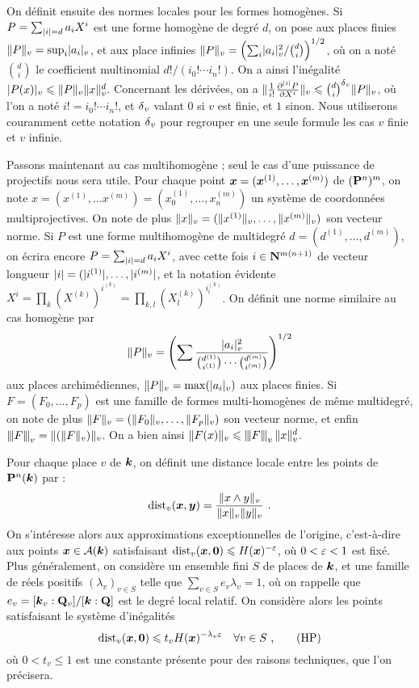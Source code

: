 \documentclass{mpg-preth}
\begin{document}
On définit ensuite des normes locales pour les formes homogènes. Si $P =
\sum_{\lvert i\rvert =d} a_i X^i$ est une forme homogène de degré $d$, on pose aux
places finies $\lVert P\rVert_{v} = \sup_i \lvert a_i\rvert_{v}$, et aux place infinies $\lVert P\rVert_{v} =
\left( \sum_i \lvert a_i\rvert_{v}^2/\binom{d}{i} \right)^{1/2}$, où on a noté
$\binom{d}{i}$ le coefficient multinomial $d!/(i_0!\cdots i_n!)$. On a ainsi
l'inégalité $\lvert P(x)\rvert_{v} \leqslant \lVert P\rVert_{v} \lVert x\rVert_{v}^d$. Concernant les dérivées, on a
$\lVert\frac{1}{i!}\frac{\partial^{\lvert i\rvert}P}{\partial X^i}\rVert_{v} \leqslant \binom{d}{i}^{\delta\smash{_v}}
\lVert P\rVert_{v}$, où l'on a noté $i! = i_0! \cdots i_n!$, et ${\delta\smash{_v}}$ valant $0$ si $v$
est finie, et $1$ sinon. Nous utiliserons couramment cette notation ${\delta\smash{_v}}$ pour
regrouper en une seule formule les cas $v$ finie et $v$ infinie.

Passons maintenant au cas multihomogène ; seul le cas d'une puissance de
projectifs nous sera utile. Pour chaque point ${\boldsymbol{x}} = ({\boldsymbol{x}}^{(1)}, \dots,
{\boldsymbol{x}}^{(m)})$ de $({\mathbf{P}}^n)^m$, on note $x = (x^{(1)}, \dots x^{(m)}) =
(x_0^{(1)}, \dots, x_n^{(m)})$ un système de coordonnées multiprojectives. On
note de plus $\lVert x\rVert_{v} = (\lVert x^{(1)}\rVert_{v},\dots, \lVert x^{(m)}\rVert_{v})$ son vecteur norme.
Si $P$ est une forme multihomogène de multidegré $d= (d^{(1)}, \dots,
d^{(m)})$, on écrira encore $P = \sum_{\lvert i\rvert=d} a_i X^i$, avec cette fois $i
\in {\mathbf{N}}^{m(n+1)}$ de vecteur longueur $\lvert i\rvert = (|i^{(1)}|, \dots, |i^{(m)}|$,
et la notation évidente $X^i = \prod_{k} (X^{(k)})^{i^{(k)}} = \prod_{k, l}
(X_l^{(k)})^{i_l^{(k)}}$. On définit une norme similaire au cas homogène par
\[
  \lVert P\rVert_{v} = \left( \sum \frac{ \lvert a_i\rvert_{v}^2}{\binom{d^{(1)}}{i^{(1)}} \cdots
  \binom{d^{(m)}}{i^{(m)}} } \right)^{1/2}
\]
aux places archimédiennes, $\lVert P\rVert_{v} = \max(\lvert a_i\rvert_{v})$ aux places finies. Si
$F = (F_0, \dots, F_p)$ est une famille de formes multi-homogènes de même
multidegré, on note de plus $\lVert F\rVert_{v} = (\lVert F_0\rVert_{v}, \dots, \lVert F_p\rVert_{v})$ son vecteur
norme, et enfin $\left\lvert\hspace{-1pt}\left\lvert\hspace{-1pt} \left\lvert F\right\rvert \hspace{-1pt}\right\rvert\hspace{-1pt}\right\rvert_{v} = \lVert(\lVert F\rVert_{v})\rVert_{v}$. On a bien ainsi $\lVert F(x)\rVert_{v} \leqslant
\left\lvert\hspace{-1pt}\left\lvert\hspace{-1pt} \left\lvert F\right\rvert \hspace{-1pt}\right\rvert\hspace{-1pt}\right\rvert_{v}\lVert x\rVert_{v}^d$.

Pour chaque place $v$ de $\boldsymbol{k}$, on définit une distance locale entre les
points de ${\mathbf{P}}^n(\boldsymbol{k})$ par :
\[
  \mathrm{dist}_v({\boldsymbol{x}}, {\boldsymbol{y}}) = \frac{\lVert x\wedge y \rVert_{v}}{\lVert x\rVert_{v}\lVert y\rVert_{v}}\text{ .}
\]
On s'intéresse alors aux approximations exceptionnelles de l'origine,
c'est-à-dire aux points ${\boldsymbol{x}} \in \mathcal{A}(\boldsymbol{k})$ satisfaisant $\mathrm{dist}_v({\boldsymbol{x}}, {\boldsymbol{0}}) \leqslant
H({\boldsymbol{x}})^{-\varepsilon}$, où $0<\varepsilon<1$ est fixé.  Plus généralement, on considère un
ensemble fini $S$ de places de $\boldsymbol{k}$, et une famille de réels positifs
$(\lambda_v)_{v\in S}$ telle que $\sum_{v\in S} e_v \lambda_v = 1$, où on
rappelle que $e_v = [\boldsymbol{k}_v : {\mathbf{Q}}_v]/[\boldsymbol{k} : {\mathbf{Q}}]$ est le degré local relatif.
On considère alors les points satisfaisant le système d'inégalités
\[
  \mathrm{dist}_v({\boldsymbol{x}}, {\boldsymbol{0}}) \leqslant t_v H({\boldsymbol{x}})^{-\lambda_v \varepsilon} \quad
  \forall v \in S \text{ ,} \tag{HP} \label{hyp}
\]
où $0<t_v\le 1$ est une constante présente pour des raisons techniques, que
l'on précisera.
\end{document}

